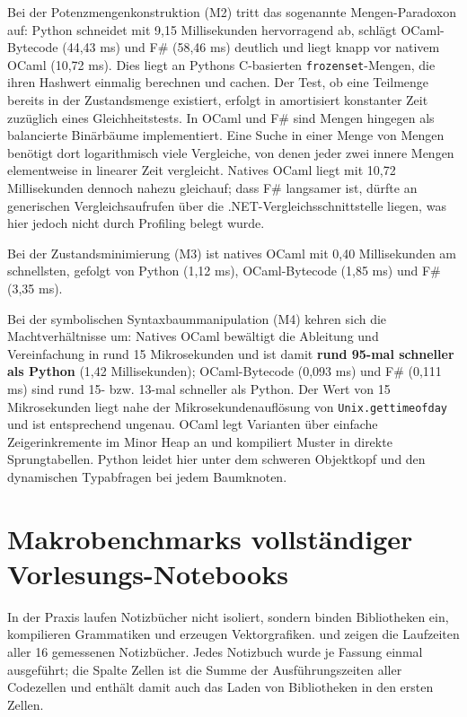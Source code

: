 Bei der Potenzmengenkonstruktion (M2) tritt das sogenannte Mengen-Paradoxon auf: Python schneidet mit 9,15 Millisekunden hervorragend ab, schlägt OCaml-Bytecode (44,43 ms) und F\# (58,46 ms) deutlich und liegt knapp vor nativem OCaml (10,72 ms).
Dies liegt an Pythons C-basierten \texttt{frozenset}-Mengen, die ihren Hashwert einmalig berechnen und cachen.
Der Test, ob eine Teilmenge bereits in der Zustandsmenge existiert, erfolgt in amortisiert konstanter Zeit zuzüglich eines Gleichheitstests.
In OCaml und F\# sind Mengen hingegen als balancierte Binärbäume implementiert.
Eine Suche in einer Menge von Mengen benötigt dort logarithmisch viele Vergleiche, von denen jeder zwei innere Mengen elementweise in linearer Zeit vergleicht.
Natives OCaml liegt mit 10,72 Millisekunden dennoch nahezu gleichauf; dass F\# langsamer ist, dürfte an generischen Vergleichsaufrufen über die .NET-Vergleichsschnittstelle liegen, was hier jedoch nicht durch Profiling belegt wurde.

Bei der Zustandsminimierung (M3) ist natives OCaml mit 0,40 Millisekunden am schnellsten, gefolgt von Python (1,12 ms), OCaml-Bytecode (1,85 ms) und F\# (3,35 ms).

Bei der symbolischen Syntaxbaummanipulation (M4) kehren sich die Machtverhältnisse um: Natives OCaml bewältigt die Ableitung und Vereinfachung in rund 15 Mikrosekunden und ist damit \textbf{rund 95-mal schneller als Python} (1,42 Millisekunden); OCaml-Bytecode (0,093 ms) und F\# (0,111 ms) sind rund 15- bzw. 13-mal schneller als Python.
Der Wert von 15 Mikrosekunden liegt nahe der Mikrosekundenauflösung von \texttt{Unix.gettimeofday} und ist entsprechend ungenau.
OCaml legt Varianten über einfache Zeigerinkremente im Minor Heap an und kompiliert Muster in direkte Sprungtabellen.
Python leidet hier unter dem schweren Objektkopf und den dynamischen Typabfragen bei jedem Baumknoten.

\section{Makrobenchmarks vollständiger Vorlesungs-Notebooks}
\label{sec:macrobenchmarks}

In der Praxis laufen Notizbücher nicht isoliert, sondern binden Bibliotheken ein, kompilieren Grammatiken und erzeugen Vektorgrafiken.
 und  zeigen die Laufzeiten aller 16 gemessenen Notizbücher.
Jedes Notizbuch wurde je Fassung einmal ausgeführt; die Spalte \glqq Zellen\grqq{} ist die Summe der Ausführungszeiten aller Codezellen und enthält damit auch das Laden von Bibliotheken in den ersten Zellen.

